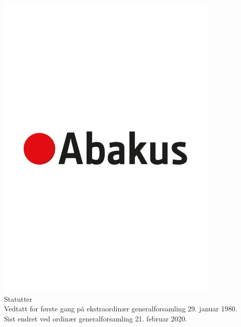 \documentclass{article}
\begin{document}
\begin{center}
  \includegraphics[width=0.8\textwidth, trim=0 300 0 100, clip]{statutter/abakus_logo.eps} \\
  \Large{Statutter} \\
  \vspace{0.4cm}
  \normalsize{Vedtatt for første gang på ekstraordinær generalforsamling 29. januar 1980. \\
              Sist endret ved ordinær generalforsamling 21. februar 2020.}
\end{center}

\newpage
\tableofcontents
\newpage


\end{document}
